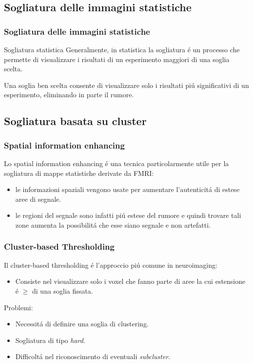 \documentclass{beamer}
\begin{document}
\subsection{Sogliatura delle immagini statistiche}
\begin{frame}
\frametitle{Sogliatura delle immagini statistiche}
\begin{block}{Sogliatura statistica}
Generalmente, in statistica \alert{la sogliatura} \'e un processo che permette di visualizzare i risultati di un esperimento maggiori di una soglia scelta. 
\end{block}

\bigskip

Una soglia ben scelta consente di visualizzare solo i risultati pi\'u significativi di un esperimento, eliminando in parte il rumore.
\end{frame}

\subsection{Sogliatura basata su cluster}
\begin{frame}
\frametitle{Spatial information enhancing}
Lo spatial information enhancing \'e una tecnica particolarmente utile per la sogliatura di mappe statistiche derivate da FMRI:
\smallskip
\begin{itemize}
\item le informazioni spaziali vengono usate per aumentare l'autenticit\'a  di estese aree di segnale.
\medskip
\item le regioni del segnale sono infatti pi\'u estese del rumore e quindi trovare tali zone aumenta la possibilit\'a che esse siano segnale e non artefatti.
\end{itemize}

\end{frame}

\begin{frame}
\frametitle{Cluster-based Thresholding}
Il cluster-based thresholding \'e l'approccio pi\'u comune in neuroimaging:
\smallskip
\begin{itemize}
\item Consiste nel visualizzare solo i voxel che fanno parte di aree la cui estensione \'e $\geq$ di una soglia fissata. 
\medskip
\end{itemize}
Problemi:
\begin{itemize}
\item Necessit\'a di definire una soglia di clustering.
\item Sogliatura di tipo \emph{hard}.
\item Difficolt\'a nel riconoscimento di eventuali \emph{subcluster}.
\end{itemize}
\end{frame}
\end{document}
